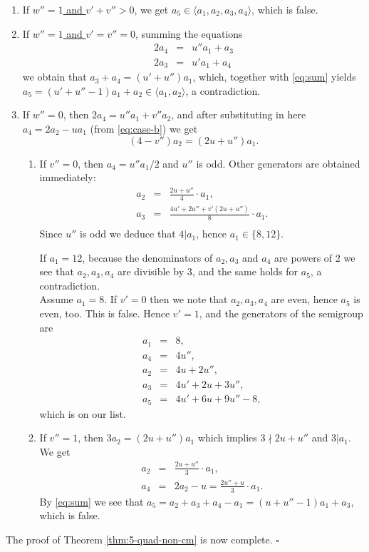 \documentclass[12pt]{amsart}
\begin{document}
		 \begin{enumerate}[leftmargin=0.5cm,label*=\arabic*.]
			\item If \underline{$w''=1$ and $v'+v'' >0$}, we get $a_5 \in \langle a_1, a_2, a_3, a_4 \rangle$, which is false.
			\item If \underline{$w''=1$ and $v'=v''=0$}, summing the equations
			    \begin{eqnarray*}
							2a_4 &=& u'' a_1+ a_3 \\
							2 a_3 &=& u' a_1 +a_4
					\end{eqnarray*}
					we obtain that $a_3+a_4=(u'+u'')a_1$, which, together with \eqref{eq:sum} yields  $a_5=(u'+u''-1)a_1+a_2 \in \langle a_1, a_2 \rangle$, a contradiction.
			\item If \underline{$w''=0$}, then $2a_4= u'' a_1+ v'' a_2$, and after substituting in here $a_4= 2a_2-ua_1$ (from \eqref{eq:case-b}) we get
			$$
			(4-v'')a_2= (2u+u'')a_1.
			$$
			\begin{enumerate}[leftmargin=0.5cm, label*=\arabic*.]
			\item			If \underline{$v''=0$}, then $a_4= u'' a_1/2$ and   $u''$ is odd.
			 Other generators are obtained immediately:
			   \begin{eqnarray*}
					 a_2 &=& \frac{2u+u''}{4} \cdot a_1, \\
					 a_3 &=& \frac{4u'+2u''+v'(2u+u'')}{8} \cdot a_1. \\
				 \end{eqnarray*}
			Since $u''$ is odd  we deduce that $4|a_1$, hence $a_1 \in \{8,12 \}$.
			
			If \underline{$a_1=12$}, because the denominators of $a_2,a_3$ and $a_4$ are powers of $2$ we see that $a_2, a_3, a_4$ are divisible by $3$, and the same holds for $a_5$, a  contradiction. \\
			\noindent Assume \underline{$a_1=8$}.  If $v'=0$ then we note that $a_2, a_3, a_4$ are even, hence $a_5$ is even, too. This is false. Hence $v'=1$, and the generators of the semigroup are
			\begin{eqnarray}
				\label{eq:sol6}
				a_1 &=& 8, \nonumber\\
				a_4 &=& 4u'', \nonumber \\
				a_2 &=& 4u+2u'', \\
				a_3 &=& 4u'+ 2u+ 3u'', \nonumber \\
				a_5 &=& 4u'+6u+ 9u''-8, \nonumber
			\end{eqnarray}
			which is on our list.
			\item If \underline{$v''=1$}, then $3a_2=(2u+u'') a_1$ which implies  $3 \nmid 2u+u''$ and  $3|a_1$.
			We get 
			\begin{eqnarray*}
				a_2 &=& \frac{2u+u''}{3} \cdot a_1, \\
				a_4 &=& 2a_2-u= \frac{2u''+u}{3} \cdot a_1.
			\end{eqnarray*}
			By \eqref{eq:sum} we see that  $a_5=a_2+a_3+a_4-a_1= (u+u''-1) a_1+ a_3$, which is false.
			\end{enumerate}
		 \end{enumerate}
The proof of Theorem \ref{thm:5-quad-non-cm} is now complete. $\square$
  
\end{document}
